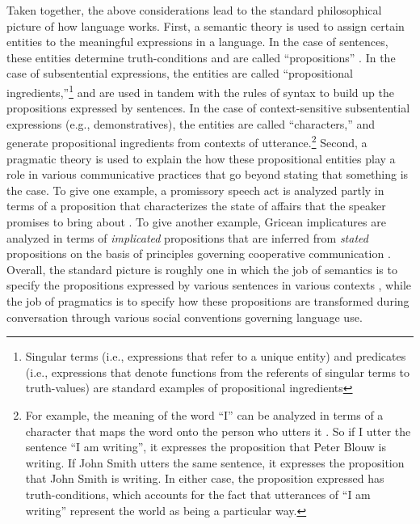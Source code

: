 Taken together, the above considerations lead to the standard philosophical picture of how language works. First, a semantic theory is used to assign certain entities to the meaningful expressions in a language. In the case of sentences, these entities determine truth-conditions and are called ``propositions'' \citep{Speaks:2014}. In the case of subsentential expressions, the entities are called ``propositional ingredients,''\footnote{Singular terms (i.e., expressions that refer to a unique entity) and predicates (i.e., expressions that denote functions from the referents of singular terms to truth-values) are standard examples of propositional ingredients} and are used in tandem with the rules of syntax to build up the propositions expressed by sentences. In the case of context-sensitive subsentential expressions (e.g., demonstratives), the entities are called ``characters,'' and generate propositional ingredients from contexts of utterance.\footnote{For example, the meaning of the word ``I'' can be analyzed in terms of a character that maps the word onto the person who utters it \citep{Stanley:2008}. So if I utter the sentence ``I am writing'', it expresses the proposition that Peter Blouw is writing. If John Smith utters the same sentence, it expresses the proposition that John Smith is writing. In either case, the proposition expressed has truth-conditions, which accounts for the fact that utterances of ``I am writing'' represent the world as being a particular way.} Second, a pragmatic theory is used to explain the how these propositional entities play a role in various communicative practices that go beyond stating that something is the case. To give one example, a promissory speech act is analyzed partly in terms of a proposition that characterizes the state of affairs that the speaker promises to bring about \citep{KortaPerry:2015,Searle:1969}. To give another example, Gricean implicatures are analyzed in terms of \textit{implicated} propositions that are inferred from \textit{stated} propositions on the basis of principles governing cooperative communication \citep{Grice:1975,KortaPerry:2015}. Overall, the standard picture is roughly one in which the job of semantics is to specify the propositions expressed by various sentences in various contexts \citep{Soames:2010,Recanati:2012,CappelenLepore:2005}, while the job of pragmatics is to specify how these propositions are transformed during conversation through various social conventions governing language use. 

